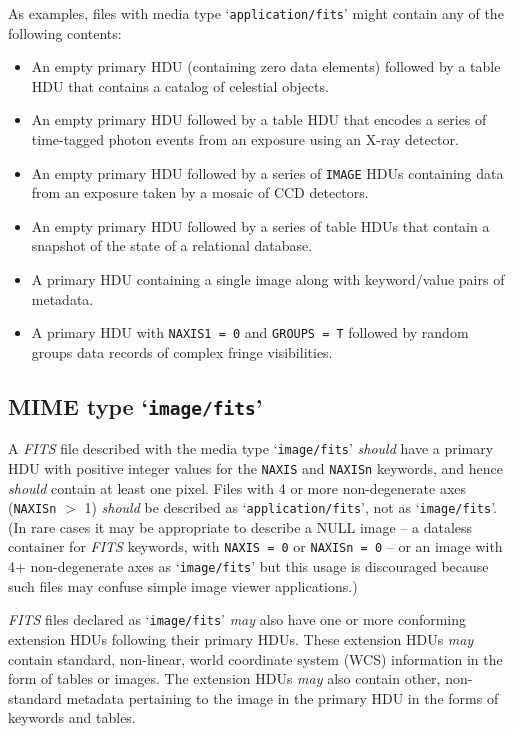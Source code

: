 \documentclass[onecolumn]{aa}
\begin{document}
  As examples, files with media type `{\tt application/fits}' might contain
  any of the following contents:
\begin{itemize}
\item
  An empty primary HDU (containing zero data elements) followed by a table
    HDU that contains a catalog of celestial objects.
\item
   An empty primary HDU followed by a table HDU that encodes a series of
    time-tagged photon events from an exposure using an X-ray detector.
\item
   An empty primary HDU followed by a series of {\tt IMAGE} HDUs containing data
    from an exposure taken by a mosaic of CCD detectors.
\item
   An empty primary HDU followed by a series of table HDUs that contain a
    snapshot of the state of a relational database.
\item
  A primary HDU containing a single image along with keyword/value pairs of
    metadata.
\item
  A primary HDU with {\tt NAXIS1 = 0} and {\tt GROUPS = T} followed by random   
  groups data  records of complex fringe visibilities.
\end{itemize}

\subsection{MIME type `{\tt image/fits}'}

  A {\em FITS\/} file described with the media type `{\tt image/fits}' {\em should} have a
  primary HDU with positive integer values for the {\tt NAXIS} and {\tt NAXISn} keywords,
  and hence {\em should} contain at least one pixel.  Files with 4 or more
  non-degenerate axes ({\tt NAXISn} $>$ 1) {\em should} be described as
  `{\tt application/fits}', not as `{\tt image/fits}'.  (In rare cases it may be
  appropriate to describe a NULL image -- a dataless container for {\em FITS\/}   
  keywords, with {\tt NAXIS = 0} or {\tt NAXISn = 0} -- or an image with 4+ 
  non-degenerate axes as `{\tt image/fits}' but this usage is discouraged because
  such files may confuse simple image viewer applications.)

  {\em FITS\/} files declared as `{\tt image/fits}' {\em may} also have one or more
  conforming extension HDUs following their primary HDUs.  These extension HDUs   {\em may}
  contain standard, non-linear, world coordinate system (WCS)
  information in the form of tables or images.  The extension HDUs {\em may}
  also contain other, non-standard metadata pertaining to the image in
  the primary HDU in the forms of keywords and tables.
\end{document}
